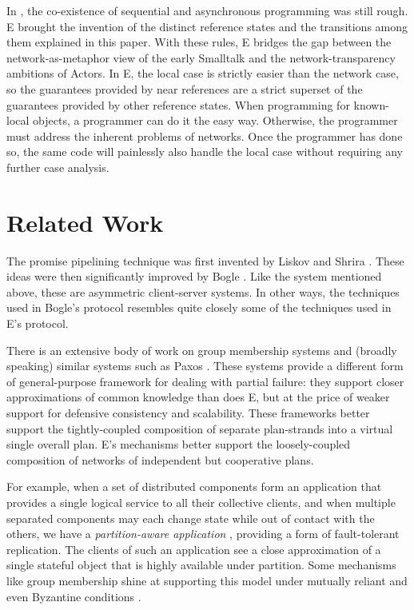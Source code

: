 \documentclass{llncs}
\begin{document}
 In , the co-existence
of sequential and asynchronous programming was still rough. E brought
the invention of the distinct reference states and the transitions
among them explained in this paper. With these rules, E bridges the
gap between the network-as-metaphor view of the early Smalltalk and
the network-transparency ambitions of Actors. In E, the local case is
strictly easier than the network case, so the guarantees provided by
near references are a strict superset of the guarantees provided by
other reference states. When programming for known-local objects, a
programmer can do it the easy way. Otherwise, the programmer must
address the inherent problems of networks.  Once the programmer has
done so, the same code will painlessly also handle the local case
without requiring any further case analysis.

\section{Related Work}

 The promise
pipelining technique was first invented by Liskov and Shrira
\cite{liskov:promises}. These ideas were then significantly improved
by Bogle \cite{bogle:batched}. Like the  system
mentioned above, these are asymmetric client-server systems. In other
ways, the techniques used in Bogle's protocol resembles quite closely
some of the techniques used in E's protocol.

 There is an extensive body of work on
group membership systems \cite{birman:vsync,amir:thesis} and (broadly
speaking) similar systems such as Paxos \cite{lamport:paxos}. These
systems provide a different form of general-purpose framework for
dealing with partial failure: they support closer approximations of
common knowledge than does E, but at the price of weaker support for
defensive consistency and scalability. These frameworks better support
the tightly-coupled composition of separate plan-strands into a
virtual single overall plan. E's mechanisms better support the
loosely-coupled composition of networks of independent but cooperative
plans. 

For example, when a set of distributed components form an application
that provides a single logical service to all their collective
clients, and when multiple separated components may each change state
while out of contact with the others, we have a \emph{partition-aware
application} \cite{partition-aware,bancomat}, providing a form of
fault-tolerant replication. The clients of such an application see a
close approximation of a single stateful object that is highly
available under partition. Some mechanisms like group membership shine
at supporting this model under mutually reliant and even Byzantine
conditions \cite{castro:bft}.
\end{document}
